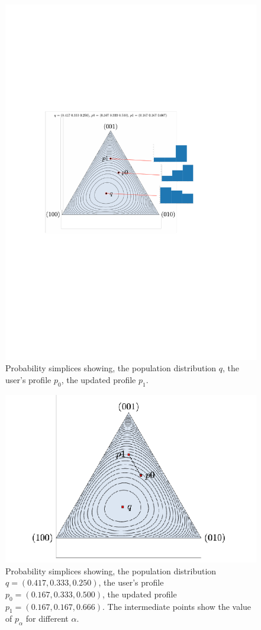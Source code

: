 \begin{figure}[htb]
\centering
\includegraphics[scale=0.5]{figures/triplex_profiles.pdf}
\caption{Probability simplices showing, the population distribution $q$, the user's profile $p_0$, the updated profile $p_1$.}
\label{fig:2-1}
\end{figure}

\begin{figure}[htb]
\centering
\includegraphics[scale=0.5]{figures/triplex_alpha.png}
\caption{Probability simplices showing, the population distribution $q=(0.417, 0.333, 0.250)$, the user's profile $p_0=(0.167, 0.333, 0.500)$, the updated profile $p_1=(0.167, 0.167, 0.666)$. The intermediate points show the value of $p_\alpha$ for different $\alpha$.}
\label{fig:2-2}
\end{figure}

